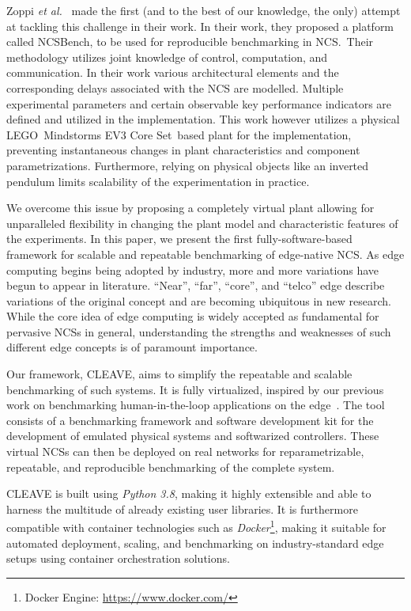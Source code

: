 Zoppi \emph{et al.}~\cite{Zoppi2020NCSBench} made the first (and to the best of our knowledge, the only) attempt at tackling this challenge in their work.
In their work, they proposed a platform called NCSBench, to be used for reproducible benchmarking in NCS.\ 
Their methodology utilizes joint knowledge of control, computation, and communication. 
In their work various architectural elements and the corresponding delays associated with the NCS are modelled. 
Multiple experimental parameters and certain observable key performance indicators are defined and utilized in the implementation. 
This work however utilizes a physical LEGO\textregistered{}\ Mindstorms EV3 Core Set\texttrademark{}\  based plant for the implementation, preventing instantaneous changes in plant characteristics and component parametrizations.
Furthermore, relying on physical objects like an inverted pendulum limits scalability of the experimentation in practice. 

We overcome this issue by proposing a completely virtual plant allowing for unparalleled flexibility in changing the plant model and characteristic features of the experiments.
In this paper, we present the first fully-software-based framework for scalable and repeatable benchmarking of edge-native \ac{NCS}.
As edge computing begins being adopted by industry, more and more variations have begun to appear in literature.
``Near'', ``far'', ``core'', and ``telco'' edge describe variations of the original concept and are becoming ubiquitous in new research.
While the core idea of edge computing is widely accepted as fundamental for pervasive \acp{NCS} in general, understanding the strengths and weaknesses of such different edge concepts is of paramount importance.

Our framework, \ac{CLEAVE}, aims to simplify the repeatable and scalable benchmarking of such systems.
It is fully virtualized, inspired by our previous work on benchmarking human-in-the-loop applications on the edge~\cite{Olguin2019EdgeDroid}.
The tool consists of a benchmarking framework and software development kit for the development of emulated physical systems and softwarized controllers.
These virtual \acp{NCS} can then be deployed on real networks for reparametrizable, repeatable, and reproducible benchmarking of the complete system.

\ac{CLEAVE} is built using \emph{Python 3.8}, making it highly extensible and able to harness the multitude of already existing user libraries.
It is furthermore compatible with container technologies such as \emph{Docker}\footnote{Docker Engine: \url{https://www.docker.com/}}, making it suitable for automated deployment, scaling, and benchmarking on industry-standard edge setups using container orchestration solutions.

